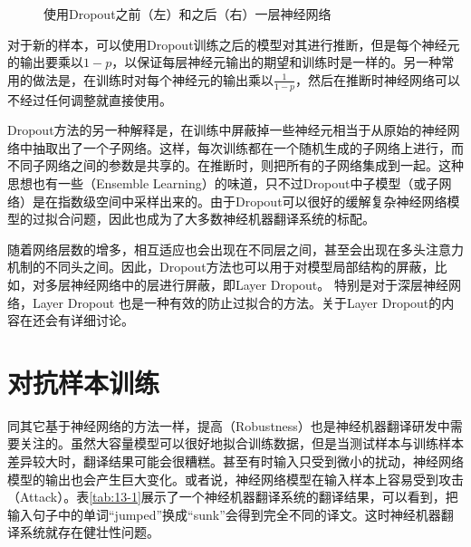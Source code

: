 \begin{figure}[htp]
\centering

\caption{使用Dropout之前（左）和之后（右）一层神经网络}
\label{fig:13-7}
\end{figure}

\parinterval 对于新的样本，可以使用Dropout训练之后的模型对其进行推断，但是每个神经元的输出要乘以$1-p$，以保证每层神经元输出的期望和训练时是一样的。另一种常用的做法是，在训练时对每个神经元的输出乘以$\frac{1}{1-p}$，然后在推断时神经网络可以不经过任何调整就直接使用。

\parinterval Dropout方法的另一种解释是，在训练中屏蔽掉一些神经元相当于从原始的神经网络中抽取出了一个子网络。这样，每次训练都在一个随机生成的子网络上进行，而不同子网络之间的参数是共享的。在推断时，则把所有的子网络集成到一起。这种思想也有一些{\small{}}（Ensemble Learning）的味道，只不过Dropout中子模型（或子网络）是在指数级空间中采样出来的。由于Dropout可以很好的缓解复杂神经网络模型的过拟合问题，因此也成为了大多数神经机器翻译系统的标配。

\parinterval 随着网络层数的增多，相互适应也会出现在不同层之间，甚至会出现在多头注意力机制的不同头之间。因此，Dropout方法也可以用于对模型局部结构的屏蔽，比如，对多层神经网络中的层进行屏蔽，即Layer Dropout。 特别是对于深层神经网络，Layer Dropout 也是一种有效的防止过拟合的方法。关于Layer Dropout的内容在{\chapterfifteen}还会有详细讨论。


\sectionnewpage
\section{对抗样本训练}
\label{sec:adversarial-examples}

\parinterval 同其它基于神经网络的方法一样，提高{\small{}}（Robustness）也是神经机器翻译研发中需要关注的。虽然大容量模型可以很好地拟合训练数据，但是当测试样本与训练样本差异较大时，翻译结果可能会很糟糕。甚至有时输入只受到微小的扰动，神经网络模型的输出也会产生巨大变化。或者说，神经网络模型在输入样本上容易受到攻击（Attack）。表\ref{tab:13-1}展示了一个神经机器翻译系统的翻译结果，可以看到，把输入句子中的单词“jumped”换成“sunk”会得到完全不同的译文。这时神经机器翻译系统就存在健壮性问题。


